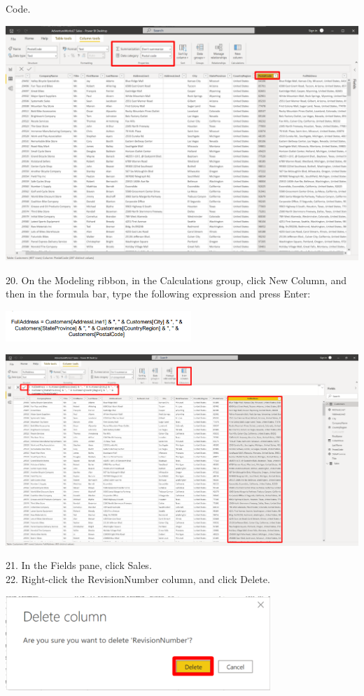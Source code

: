 \documentclass[12pt,letterpaper]{article}
\begin{document}
Code.
\begin{center}
    \includegraphics[width=15.5cm]{img/119.png}  
\end{center}
20. On the Modeling ribbon, in the Calculations group, click New Column, and then in the formula bar, type the
following expression and press Enter:
\begin{center}
    \includegraphics[width=7cm]{img/113.png}  
\end{center}
\begin{center}
    \includegraphics[width=17cm]{img/31.png}  
\end{center}
21. In the Fields pane, click Sales.
\\22. Right-click the RevisionNumber column, and click Delete.
\begin{center}
    \includegraphics[width=10cm]{img/32.png} 
    \vspace{1cm}  
\end{center}
\end{document}
